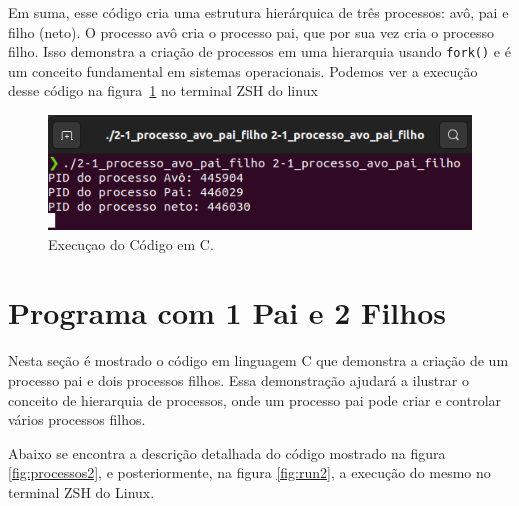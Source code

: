 \documentclass[
	12pt,				%
	openright,			%
	oneside,			%
	a4paper,			%
	chapter=TITLE,		%
	english,			%
	french,				%
	spanish,			%
	brazil				%
	]{abntex2}
\theoremstyle{definition}
\begin{document}
Em suma, esse código cria uma estrutura hierárquica de três processos: avô, 
pai e filho (neto). O processo avô cria o processo pai, 
que por sua vez cria o processo filho. Isso demonstra a 
criação de processos em uma hierarquia usando \texttt{fork()} e é 
um conceito fundamental em sistemas operacionais. Podemos ver 
a execução desse código na figura~\ref{fig:run1} no terminal ZSH do linux

\begin{figure}
    \centering
    \includegraphics[width=1.0\textwidth]{imagens/run_processos_1.png}
	\caption{Execuçao do Código em C. }
	\label{fig:run1}
\end{figure}

\section{Programa com 1 Pai e 2 Filhos}

Nesta seção é mostrado o código em linguagem C que demonstra a 
criação de um processo pai e dois processos filhos. Essa demonstração ajudará 
a ilustrar o conceito de hierarquia de processos, onde um processo pai pode 
criar e controlar vários processos filhos.

Abaixo se encontra a descrição detalhada do código mostrado na figura \ref{fig:processos2}, e posteriormente, 
na figura \ref{fig:run2}, a execução do mesmo no terminal ZSH do Linux.
\end{document}
